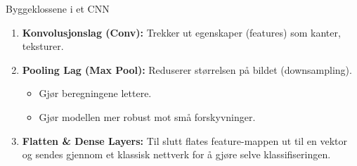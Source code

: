 \documentclass[aspectratio=169]{beamer}
\begin{document}
\begin{frame}{Byggeklossene i et CNN}
    \begin{enumerate}
        \item \textbf{Konvolusjonslag (Conv):}
        Trekker ut egenskaper (features) som kanter, teksturer.
        
        \item \textbf{Pooling Lag (Max Pool):}
        Reduserer størrelsen på bildet (downsampling).
        \begin{itemize}
            \item Gjør beregningene lettere.
            \item Gjør modellen mer robust mot små forskyvninger.
        \end{itemize}
        
        \item \textbf{Flatten \& Dense Layers:}
        Til slutt flates feature-mappen ut til en vektor og sendes gjennom et klassisk nettverk for å gjøre selve klassifiseringen.
    \end{enumerate}
\end{frame}
\end{document}
